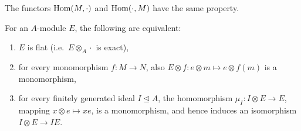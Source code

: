 \begin{remark}
  The functors $\operatorname{Hom}(M, \cdot)$ and $\operatorname{Hom}(\cdot, M)$ have the same property.
\end{remark}

\begin{theorem}
  For an $A$-module $E$, the following are equivalent:
  \begin{enumerate}
  \item $E$ is flat (i.e.~$E \otimes_A \cdot$ is exact),
  \item for every monomorphism $f: M \to N$, also $E \otimes f: e \otimes m
	\mapsto e \otimes f(m)$ is a monomorphism,
  \item for every finitely generated ideal $I \trianglelefteq A$, the
	homomorphism $\mu_I : I \otimes E \to E$, mapping $x \otimes e \mapsto xe$,
	is a monomorphism, and hence induces an isomorphism $I \otimes E \to IE$.
  \end{enumerate}
\end{theorem}

